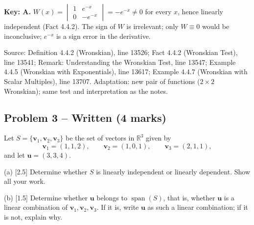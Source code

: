 \documentclass[11pt,a4paper]{article}
\newcommand{\Src}[1]{{\footnotesize\color{black!65}Source: #1}}
\begin{document}
\textbf{Key: A.} $W(x)=\begin{vmatrix}1&e^{-x}\\0&-e^{-x}\end{vmatrix}=-e^{-x}\neq0$ for every $x$, hence linearly independent (Fact 4.4.2). The sign of $W$ is irrelevant; only $W\equiv0$ would be inconclusive; $e^{-x}$ is a sign error in the derivative.\par
\Src{Definition 4.4.2 (Wronskian), line 13526; Fact 4.4.2 (Wronskian Test), line 13541; Remark: Understanding the Wronskian Test, line 13547; Example 4.4.5 (Wronskian with Exponentials), line 13617; Example 4.4.7 (Wronskian with Scalar Multiples), line 13707. Adaptation: new pair of functions ($2\times2$ Wronskian); same test and interpretation as the notes.}\par
\subsection*{Problem 3 -- Written (4 marks)}
Let $S=\{\mathbf{v}_1,\mathbf{v}_2,\mathbf{v}_3\}$ be the set of vectors in $\mathbb{R}^3$ given by\[\mathbf{v}_1=(1,1,2),\qquad \mathbf{v}_2=(1,0,1),\qquad \mathbf{v}_3=(2,1,1),\]and let $\mathbf{u}=(3,3,4)$.\par (a) [2.5] Determine whether $S$ is linearly independent or linearly dependent. Show all your work.\par (b) [1.5] Determine whether $\mathbf{u}$ belongs to $\operatorname{span}(S)$, that is, whether $\mathbf{u}$ is a linear combination of $\mathbf{v}_1,\mathbf{v}_2,\mathbf{v}_3$. If it is, write $\mathbf{u}$ as such a linear combination; if it is not, explain why.\par
\end{document}
